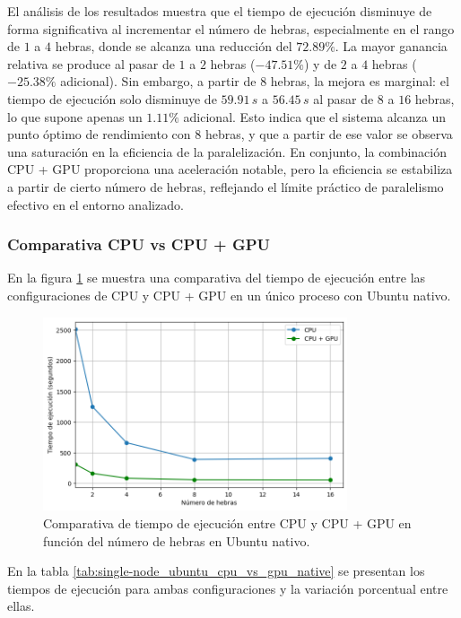 El análisis de los resultados muestra que el tiempo de ejecución disminuye de forma significativa al incrementar el número de hebras, especialmente en el rango de $1$ a $4$ hebras, donde se alcanza una reducción del $72.89\%$. La mayor ganancia relativa se produce al pasar de $1$ a $2$ hebras ($-47.51\%$) y de $2$ a $4$ hebras ($-25.38\%$ adicional). Sin embargo, a partir de $8$ hebras, la mejora es marginal: el tiempo de ejecución solo disminuye de $59.91\,s$ a $56.45\,s$ al pasar de $8$ a $16$ hebras, lo que supone apenas un $1.11\%$ adicional. Esto indica que el sistema alcanza un punto óptimo de rendimiento con $8$ hebras, y que a partir de ese valor se observa una saturación en la eficiencia de la paralelización. En conjunto, la combinación CPU + GPU proporciona una aceleración notable, pero la eficiencia se estabiliza a partir de cierto número de hebras, reflejando el límite práctico de paralelismo efectivo en el entorno analizado.

\subsubsection{Comparativa CPU vs CPU + GPU}

En la figura \ref{fig:single-node_ubuntu_cpu_vs_gpu_native_time} se muestra una comparativa del tiempo de ejecución entre las configuraciones de CPU y CPU + GPU en un único proceso con Ubuntu nativo.

\begin{figure}[ht]
    \centering
    \includegraphics[width=0.8\textwidth]{imagenes/cap5/single-node_ubuntu_cpu_vs_gpu_native_time.png}
    \caption{Comparativa de tiempo de ejecución entre CPU y CPU + GPU en función del número de hebras en Ubuntu nativo.}
    \label{fig:single-node_ubuntu_cpu_vs_gpu_native_time}
\end{figure}

En la tabla \ref{tab:single-node_ubuntu_cpu_vs_gpu_native} se presentan los tiempos de ejecución para ambas configuraciones y la variación porcentual entre ellas.

